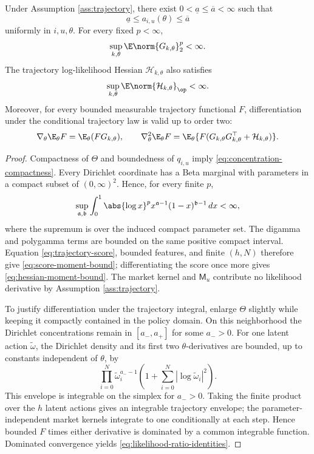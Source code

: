 \begin{lemma}\label{lem:dirichlet-moments}
Under Assumption \ref{ass:trajectory}, there exist $0<\underline a\le\overline a<\infty$ such that
\begin{equation}\label{eq:concentration-compactness}
 \underline a\le a_{i,u}(\theta)\le\overline a
\end{equation}
uniformly in $i,u,\theta$.  For every fixed $p<\infty$,
\begin{equation}\label{eq:score-moment-bound}
 \sup_{k,\theta}\E\norm{G_{k,\theta}}_2^p<\infty.
\end{equation}
The trajectory log-likelihood Hessian $\mathcal H_{k,\theta}$ also satisfies
\begin{equation}\label{eq:hessian-moment-bound}
 \sup_{k,\theta}\E\norm{\mathcal H_{k,\theta}}_{\op}<\infty.
\end{equation}
Moreover, for every bounded measurable trajectory functional $F$, differentiation under the conditional trajectory law is valid up to order two:
\begin{equation}\label{eq:likelihood-ratio-identities}
 \nabla_\theta\E_\theta F=\E_\theta(FG_{k,\theta}),
 \qquad
 \nabla_\theta^2\E_\theta F
 =\E_\theta\{F(G_{k,\theta}G_{k,\theta}^\top+\mathcal H_{k,\theta})\}.
\end{equation}
\end{lemma}

\begin{proof}
Compactness of $\Theta$ and boundedness of $q_{i,u}$ imply \eqref{eq:concentration-compactness}.  Every Dirichlet coordinate has a Beta marginal with parameters in a compact subset of $(0,\infty)^2$.  Hence, for every finite $p$,
\[
 \sup_{\mathfrak a,\mathfrak b}\int_0^1
 \abs{\log x}^p x^{\mathfrak a-1}(1-x)^{\mathfrak b-1}\,dx<\infty,
\]
where the supremum is over the induced compact parameter set.  The digamma and polygamma terms are bounded on the same positive compact interval.  Equation \eqref{eq:trajectory-score}, bounded features, and finite $(h,N)$ therefore give \eqref{eq:score-moment-bound}; differentiating the score once more gives \eqref{eq:hessian-moment-bound}.  The market kernel and $\mathsf M_u$ contribute no likelihood derivative by Assumption \ref{ass:trajectory}.

To justify differentiation under the trajectory integral, enlarge $\Theta$ slightly while keeping it compactly contained in the policy domain.  On this neighborhood the Dirichlet concentrations remain in $[a_-,a_+]$ for some $a_->0$.  For one latent action $\widetilde\omega$, the Dirichlet density and its first two $\theta$-derivatives are bounded, up to constants independent of $\theta$, by
\[
 \prod_{i=0}^{N}\widetilde\omega_i^{a_- -1}
 \left(1+\sum_{i=0}^{N}|\log\widetilde\omega_i|^2\right).
\]
This envelope is integrable on the simplex for $a_->0$.  Taking the finite product over the $h$ latent actions gives an integrable trajectory envelope; the parameter-independent market kernels integrate to one conditionally at each step.  Hence bounded $F$ times either derivative is dominated by a common integrable function.  Dominated convergence yields \eqref{eq:likelihood-ratio-identities}.
\end{proof}

